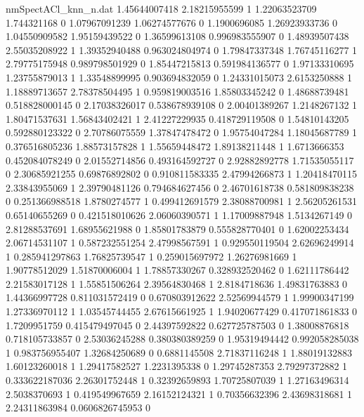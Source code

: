 \begin{filecontents}{nmSpectACl_knn_n.dat}
1.45644007418 2.18215955599 1
1.22063523709 1.744321168 0
1.07967091239 1.06274577676 0
1.1900696085 1.26923933736 0
1.04550909582 1.95159439522 0
1.36599613108 0.996983555907 0
1.48939507438 2.55035208922 1
1.39352940488 0.963024804974 0
1.79847337348 1.76745116277 1
2.79775175948 0.989798501929 0
1.85447215813 0.591984136577 0
1.97133310695 1.23755879013 1
1.33548899995 0.903694832059 0
1.24331015073 2.6153250888 1
1.18889713657 2.78378504495 1
0.959819003516 1.85803345242 0
1.48688739481 0.518828000145 0
2.17038326017 0.538678939108 0
2.00401389267 1.2148267132 1
1.80471537631 1.56843402421 1
2.41227229935 0.418729119508 0
1.54810143205 0.592880123322 0
2.70786075559 1.37847478472 0
1.95754047284 1.18045687789 1
0.376516805236 1.88573157828 1
1.55659448472 1.89138211448 1
1.6713666353 0.452084078249 0
2.01552714856 0.493164592727 0
2.92882892778 1.71535055117 0
2.30685921255 0.69876892802 0
0.910811583335 2.47994266873 1
1.20418470115 2.33843955069 1
2.39790481126 0.794684627456 0
2.46701618738 0.581809838238 0
0.251366988518 1.8780274577 1
0.499412691579 2.38088700981 1
2.56205261531 0.65140655269 0
0.421518010626 2.06060390571 1
1.17009887948 1.5134267149 0
2.81288537691 1.68955621988 0
1.85801783879 0.555828770401 0
1.62002253434 2.06714531107 1
0.587232551254 2.47998567591 1
0.929550119504 2.62696249914 1
0.285941297863 1.76825739547 1
0.259015697972 1.26276981669 1
1.90778512029 1.51870006004 1
1.78857330267 0.328932520462 0
1.62111786442 2.21583017128 1
1.55851506264 2.39564830468 1
2.8184718636 1.49831763883 0
1.44366997728 0.811031572419 0
0.670803912622 2.52569944579 1
1.99900347199 1.27336970112 1
1.03545744455 2.67615661925 1
1.94020677429 0.417071861833 0
1.7209951759 0.415479497045 0
2.44397592822 0.627725787503 0
1.38008876818 0.718105733857 0
2.53036245288 0.380380389259 0
1.95319494442 0.992058285038 1
0.983756955407 1.32684250689 0
0.6881145508 2.71837116248 1
1.88019132883 1.60123260018 1
1.29417582527 1.2231395338 0
1.29745287353 2.79297372882 1
0.333622187036 2.26301752448 1
0.32392659893 1.70725807039 1
1.27163496314 2.5038370693 1
0.419549967659 2.16152124321 1
0.70356632396 2.43698318681 1
2.24311863984 0.0606826745953 0
\end{filecontents}
